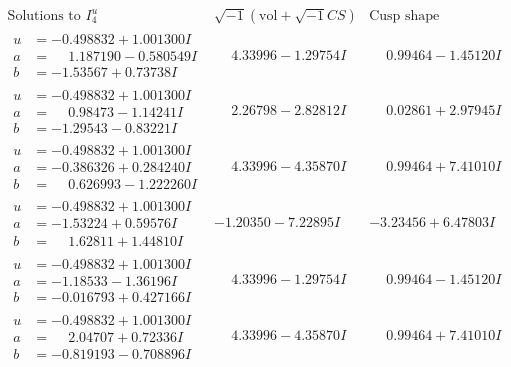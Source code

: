 \documentclass[1p]{elsarticle_modified}
\theoremstyle{definition}
\newcommand{\I}{\sqrt{-1}}
\begin{document}
$$\begin{array}{c|c|c}  
\text{Solutions to }I^u_{4}& \I (\text{vol} + \sqrt{-1}CS) & \text{Cusp shape}\\
 \hline 
\begin{aligned}
u &= -0.498832 + 1.001300 I \\
a &= \phantom{-}1.187190 - 0.580549 I \\
b &= -1.53567 + 0.73738 I\end{aligned}
 & \phantom{-}4.33996 - 1.29754 I & \phantom{-}0.99464 - 1.45120 I \\ \hline\begin{aligned}
u &= -0.498832 + 1.001300 I \\
a &= \phantom{-}0.98473 - 1.14241 I \\
b &= -1.29543 - 0.83221 I\end{aligned}
 & \phantom{-}2.26798 - 2.82812 I & \phantom{-}0.02861 + 2.97945 I \\ \hline\begin{aligned}
u &= -0.498832 + 1.001300 I \\
a &= -0.386326 + 0.284240 I \\
b &= \phantom{-}0.626993 - 1.222260 I\end{aligned}
 & \phantom{-}4.33996 - 4.35870 I & \phantom{-}0.99464 + 7.41010 I \\ \hline\begin{aligned}
u &= -0.498832 + 1.001300 I \\
a &= -1.53224 + 0.59576 I \\
b &= \phantom{-}1.62811 + 1.44810 I\end{aligned}
 & -1.20350 - 7.22895 I & -3.23456 + 6.47803 I \\ \hline\begin{aligned}
u &= -0.498832 + 1.001300 I \\
a &= -1.18533 - 1.36196 I \\
b &= -0.016793 + 0.427166 I\end{aligned}
 & \phantom{-}4.33996 - 1.29754 I & \phantom{-}0.99464 - 1.45120 I \\ \hline\begin{aligned}
u &= -0.498832 + 1.001300 I \\
a &= \phantom{-}2.04707 + 0.72336 I \\
b &= -0.819193 - 0.708896 I\end{aligned}
 & \phantom{-}4.33996 - 4.35870 I & \phantom{-}0.99464 + 7.41010 I \\ \hline\begin{aligned}

\end{aligned}
\end{array}$$
\end{document}
